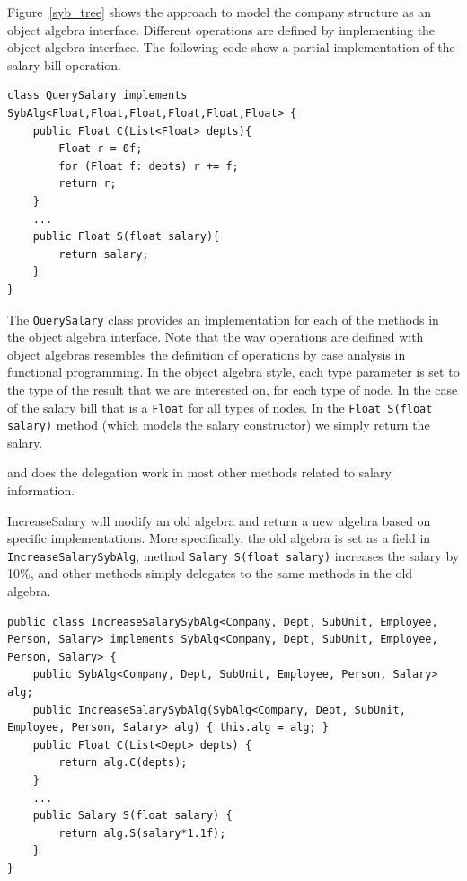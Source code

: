 Figure~\ref{syb_tree} shows the approach to model the company
structure as an object algebra interface. Different operations are
defined by implementing the object algebra interface. The following 
code show a partial implementation of the salary bill operation.

\begin{lstlisting}[numbers=none] 
class QuerySalary implements SybAlg<Float,Float,Float,Float,Float,Float> {
	public Float C(List<Float> depts){
		Float r = 0f;
		for (Float f: depts) r += f;
		return r;
	}
	...
	public Float S(float salary){
		return salary;
	}
}
\end{lstlisting}

The \lstinline{QuerySalary} class provides an implementation for each 
of the methods in the object algebra interface. Note that the way
operations are deifined with object algebras resembles the definition 
of operations by case analysis in functional programming.
In the object algebra
style, each type parameter is set to the type of the result that we
are interested on, for each type of node. In the case of the salary
bill that is a \lstinline{Float} for all types of nodes. In the 
\lstinline{Float S(float salary)} method (which models the salary 
constructor) we simply return the salary. 

and does the delegation work in most
other methods related to salary information.

IncreaseSalary will modify an old algebra and return a new algebra based on specific implementations. More specifically, the old algebra is set as a field in \lstinline{IncreaseSalarySybAlg}, method  \lstinline{Salary S(float salary)} increases the salary by 10\%, and other methods simply delegates to the same methods in the old algebra. 

\begin{lstlisting}[numbers=none]
public class IncreaseSalarySybAlg<Company, Dept, SubUnit, Employee, Person, Salary> implements SybAlg<Company, Dept, SubUnit, Employee, Person, Salary> {
	public SybAlg<Company, Dept, SubUnit, Employee, Person, Salary> alg;
	public IncreaseSalarySybAlg(SybAlg<Company, Dept, SubUnit, Employee, Person, Salary> alg) { this.alg = alg; }
	public Float C(List<Dept> depts) {
		return alg.C(depts);
	}
	...
	public Salary S(float salary) {
		return alg.S(salary*1.1f);
	}
}
\end{lstlisting}

